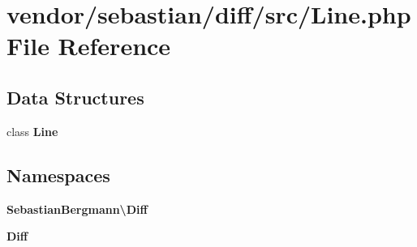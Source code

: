 \section{vendor/sebastian/diff/src/\+Line.php File Reference}
\label{sebastian_2diff_2src_2_line_8php}
\subsection*{Data Structures}
\begin{DoxyCompactItemize}
\item 
class {\bf Line}
\end{DoxyCompactItemize}
\subsection*{Namespaces}
\begin{DoxyCompactItemize}
\item 
 {\bf Sebastian\+Bergmann\textbackslash{}\+Diff}
\item 
 {\bf Diff}
\end{DoxyCompactItemize}
